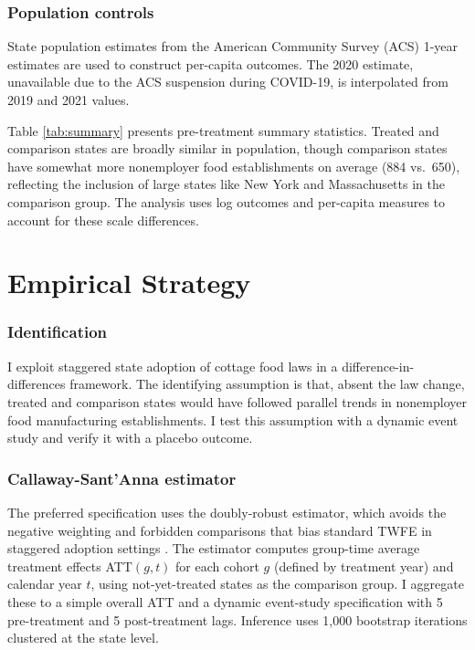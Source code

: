 \documentclass[12pt]{article}
\begin{document}
\subsubsection*{Population controls} State population estimates from the American Community Survey (ACS) 1-year estimates are used to construct per-capita outcomes. The 2020 estimate, unavailable due to the ACS suspension during COVID-19, is interpolated from 2019 and 2021 values.



Table \ref{tab:summary} presents pre-treatment summary statistics. Treated and comparison states are broadly similar in population, though comparison states have somewhat more nonemployer food establishments on average (884 vs.\ 650), reflecting the inclusion of large states like New York and Massachusetts in the comparison group. The analysis uses log outcomes and per-capita measures to account for these scale differences.


\section{Empirical Strategy}

\subsubsection*{Identification} I exploit staggered state adoption of cottage food laws in a difference-in-differences framework. The identifying assumption is that, absent the law change, treated and comparison states would have followed parallel trends in nonemployer food manufacturing establishments. I test this assumption with a dynamic event study and verify it with a placebo outcome.

\subsubsection*{Callaway-Sant'Anna estimator} The preferred specification uses the \citet{callaway2021difference} doubly-robust estimator, which avoids the negative weighting and forbidden comparisons that bias standard TWFE in staggered adoption settings \citep{goodman2021difference, dechaisemartin2020two, borusyak2024revisiting}. The estimator computes group-time average treatment effects ATT$(g,t)$ for each cohort $g$ (defined by treatment year) and calendar year $t$, using not-yet-treated states as the comparison group. I aggregate these to a simple overall ATT and a dynamic event-study specification with 5 pre-treatment and 5 post-treatment lags. Inference uses 1,000 bootstrap iterations clustered at the state level.
\end{document}
